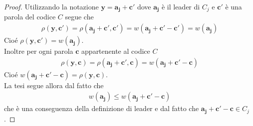 \begin{proof}
    Utilizzando la notazione $\mathbf{y} = \mathbf{a_{j}} + \mathbf{c'}$ dove $\mathbf{a_{j}}$ è il leader di $C_{j}$ e $\mathbf{c'}$ è una parola del codice $C$ segue che 
   \begin{align*}
      \rho (\mathbf{y} ,\mathbf{c'}) = \rho ( \mathbf{a_{j}} + \mathbf{c'} ,\mathbf{c'}) 
      = w(\mathbf{a_{j}} + \mathbf{c'} - \mathbf{c'}) = w(\mathbf{a_{j}}) 
   \end{align*}
   Cioé $\rho (\mathbf{y} ,\mathbf{c'}) = w(\mathbf{a_{j}})$. \\ 
   Inoltre per ogni parola $\mathbf{c}$ appartenente al codice $C$ 
   \begin{align*}
      \rho (\mathbf{y} ,\mathbf{c}) = \rho ( \mathbf{a_{j}} + \mathbf{c'} ,\mathbf{c}) 
      = w(\mathbf{a_{j}} + \mathbf{c'} - \mathbf{c})  
   \end{align*}
   Cioé $w(\mathbf{a_{j}} + \mathbf{c'} - \mathbf{c}) = \rho(\mathbf{y} ,\mathbf{c})$. \\
   La tesi segue allora dal fatto che 
   \begin{align*}
      w(\mathbf{a_{j}}) \leq w(\mathbf{a_{j}} + \mathbf{c'} - \mathbf{c})  
   \end{align*}
   che è una conseguenza della definizione di leader e dal fatto che $\mathbf{a_{j}} + \mathbf{c'} - \mathbf{c} \in C_{j}$. 
\end{proof}

